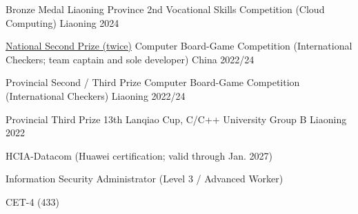 
\begin{cvhonors}

  \cvhonor
    {Bronze Medal}
    {Liaoning Province 2nd Vocational Skills Competition (Cloud Computing)}
    {Liaoning}
    {2024}

  \cvhonor
    {\href{http://computergames.caai.cn/download/2024\%E6\%9C\%BA\%E5\%99\%A8\%E5\%8D\%9A\%E5\%BC\%88\%E7\%AB\%9E\%E8\%B5\%9B\%E6\%88\%90\%E7\%BB\%A9\%E5\%85\%AC\%E7\%A4\%BA.pdf}{National Second Prize (twice)}}
    {Computer Board-Game Competition (International Checkers; team captain and sole developer)}
    {China}
    {2022/24}

  \cvhonor
    {Provincial Second / Third Prize}
    {Computer Board-Game Competition (International Checkers)}
    {Liaoning}
    {2022/24}

  \cvhonor
    {Provincial Third Prize}
    {13th Lanqiao Cup, C/C++ University Group B}
    {Liaoning}
    {2022}

\end{cvhonors}


\begin{cvhonors}

  \cvhonor
    {HCIA-Datacom (Huawei certification; valid through Jan. 2027)}
    {}
    {}
    {}

  \cvhonor
    {Information Security Administrator (Level 3 / Advanced Worker)}
    {}
    {}
    {}

  \cvhonor
    {CET-4 (433)}
    {}
    {}
    {}

\end{cvhonors}
